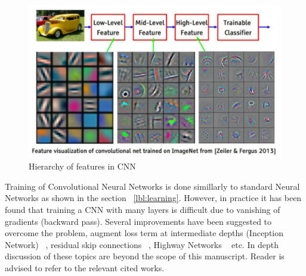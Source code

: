 \begin{figure}[H]
	\centering
   \includegraphics[scale=0.36]{figures/intro/features.png}
   \caption[Hierarchy of features]{Hierarchy of features in CNN}
   \label{fig:features}
\end{figure}

Training of Convolutional Neural Networks is done simillarly to standard Neural Networks as shown in the section ~\ref{lbl:learning}. However, in practice it has been found that training a CNN with many layers is difficult due to vanishing of gradients (backward pass). Several improvements have been suggested to overcome the problem, augment loss term at intermediate depths (Inception Network) ~\cite{Szegedy2016RethinkingTI}, residual skip connections ~\cite{he2016deep}, Highway Networks ~\cite{srivastava2015highway} etc. In depth discussion of these topics are beyond the scope of this manuscript. Reader is advised to refer to the relevant cited works.
